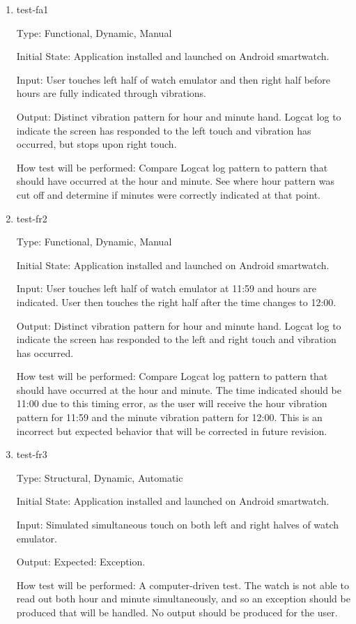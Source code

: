 \begin{enumerate}

\item{test-fa1\\}

Type: Functional, Dynamic, Manual
					
Initial State: Application installed and launched on Android smartwatch. 
					
Input: User touches left half of watch emulator and then right half before hours are fully indicated through vibrations.
					
Output: Distinct vibration pattern for hour and minute hand. Logcat log to indicate the screen has responded to the left touch and vibration has occurred, but stops upon right touch.
					
How test will be performed: Compare Logcat log pattern to pattern that should have occurred at the hour and minute. See where hour pattern was cut off and determine if minutes were correctly indicated at that point. 
					
\item{test-fr2\\}

Type: Functional, Dynamic, Manual
					
Initial State: Application installed and launched on Android smartwatch. 
					
Input: User touches left half of watch emulator at 11:59 and hours are indicated. User then touches the right half after the time changes to 12:00.
					
Output: Distinct vibration pattern for hour and minute hand. Logcat log to indicate the screen has responded to the left and right touch and vibration has occurred.
					
How test will be performed: Compare Logcat log pattern to pattern that should have occurred at the hour and minute. The time indicated should be 11:00 due to this timing error, as the user will receive the hour vibration pattern for 11:59 and the minute vibration pattern for 12:00. This is an incorrect but expected behavior that will be corrected in future revision.

\item{test-fr3\\}

Type: Structural, Dynamic, Automatic
					
Initial State: Application installed and launched on Android smartwatch. 
					
Input: Simulated simultaneous touch on both left and right halves of watch emulator.
					
Output: Expected: Exception.
					
How test will be performed: A computer-driven test. The watch is not able to read out both hour and minute simultaneously, and so an exception should be produced that will be handled. No output should be produced for the user.

\end{enumerate}

